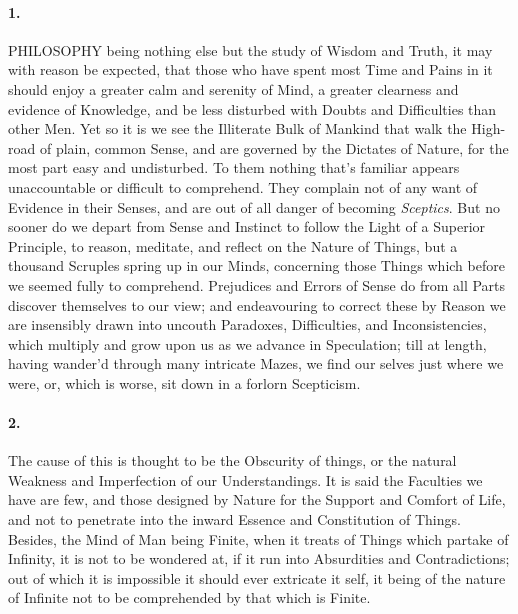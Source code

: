 \documentclass[]{article}
\newenvironment{sectionbody}{\begin{multicols}{2}}{\end{multicols}}
\begin{document}
\begin{sectionbody}

\paragraph{1.} PHILOSOPHY being nothing else but the study of Wisdom and Truth,
it may with reason be expected, that those who have spent most
Time and Pains in it should enjoy a greater calm and serenity of
Mind, a greater clearness and evidence of Knowledge, and be less
disturbed with Doubts and Difficulties than other Men.  Yet so it
is we see the Illiterate Bulk of Mankind that walk the High-road
of plain, common Sense, and are governed by the Dictates of
Nature, for the most part easy and undisturbed.  To them nothing
that's familiar appears unaccountable or difficult to comprehend.
They complain not of any want of Evidence in their Senses, and
are out of all danger of becoming \emph{Sceptics}.  But no
sooner do we depart from Sense and Instinct to follow the Light
of a Superior Principle, to reason, meditate, and reflect on the
Nature of Things, but a thousand Scruples spring up in our Minds,
concerning those Things which before we seemed fully to
comprehend.  Prejudices and Errors of Sense do from all Parts
discover themselves to our view; and endeavouring to correct
these by Reason we are insensibly drawn into uncouth Paradoxes,
Difficulties, and Inconsistencies, which multiply and grow upon
us as we advance in Speculation; till at length, having wander'd
through many intricate Mazes, we find our selves just where we
were, or, which is worse, sit down in a forlorn Scepticism.



\paragraph{2.} The cause of this is thought to be the Obscurity of things, or
the natural Weakness and Imperfection of our Understandings.  It
is said the Faculties we have are few, and those designed by
Nature for the Support and Comfort of Life, and not to penetrate
into the inward Essence and Constitution of Things.  Besides, the
Mind of Man being Finite, when it treats of Things which partake
of Infinity, it is not to be wondered at, if it run into
Absurdities and Contradictions; out of which it is impossible it
should ever extricate it self, it being of the nature of Infinite
not to be comprehended by that which is Finite.




\end{sectionbody}
\end{document}
